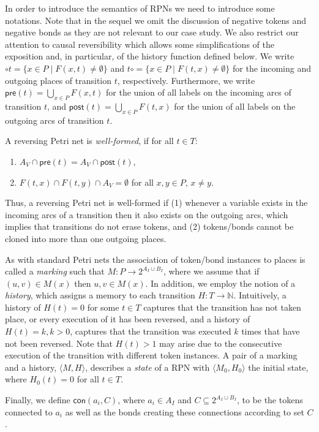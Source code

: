 \documentclass[runningheads]{llncs}
\newcommand{\PN}{reversing Petri net }
\newcommand{\guard}[1]{\mathsf{pre}(#1)}
\newcommand{\effects}[1]{\mathsf{post}(#1)}
\newcommand{\connected}{\mathsf{con}}
\newcommand{\state}[2]{\langle {#1}, {#2}\rangle}
\begin{document}
In order to introduce the semantics of RPNs we need to introduce some notations. Note that in 
the sequel we omit the discussion of negative tokens and negative bonds as they are not relevant to our
case study. We also restrict  our attention to causal reversibility which allows some simplifications
of the exposition and, in particular, of the history function defined below.
We write 
$\circ t =   \{x\in P\mid  F(x,t)\neq \emptyset\}$ and  
$ t\circ = \{x\in P\mid F(t,x)\neq \emptyset\}$
for the incoming and outgoing places of transition
$t$, respectively. Furthermore, we write
$\guard{t}  =   \bigcup_{x\in P} F(x,t)$ 
for the union of all labels on the
incoming arcs of  transition $t$, 
and $\effects{t}  =   \bigcup_{x\in P} F(t,x)$
for the union of all labels on the 
outgoing arcs of transition $t$. 
\begin{definition}\label{well-formed}{\rm 
		A \PN is \emph{well-formed}, if for all $t\in T$:
		\begin{enumerate}
			\item $A_V\cap \guard{t} = A_V\cap \effects{t}$,
			\item $ F(t,x)\cap F(t,y)\cap A_V=\emptyset$ for all $x,y\in P$, $x\neq y $. 
		\end{enumerate}
}\end{definition}
Thus, a \PN is well-formed if (1) whenever a variable exists in
the incoming arcs of a transition then it also exists on the outgoing arcs, which implies that transitions do not
erase tokens, and  (2) 
tokens/bonds cannot be cloned into more than one outgoing places.

As with standard Petri nets the association of token/bond instances to places is called a \emph{marking}  such that 
$M: P\rightarrow 2^{A_I\cup B_I}$, where we assume that if $(u,v)\in M(x)$ then $u, v\in M(x)$. 
In addition, we employ the notion of a \emph{history}, which assigns a memory to each
transition $H : T\rightarrow \mathbb{N}$. 
Intuitively, a history of $H(t) = 0$ for some $t \in T$ captures that the transition has not taken place, or 
every execution of it has been reversed, and a history
of $ H(t)=k, k>0$, captures that the transition was executed  $k$ times that have not been  reversed.
Note that $H(t)>1$ may
arise due to the consecutive execution of the transition with different token
instances. A pair of a marking and a history, $\state{M}{H}$, describes a \emph{state} of a RPN 
with $\state{M_0}{H_0}$ the initial state, where $H_0(t) = 0$ for all $t\in T$. 

Finally, we define $\connected(a_i,C)$, where $a_i\in A_I$ and $C\subseteq 2^{A_I\cup B_I}$,
to be the tokens connected
to $a_i$  as well as the bonds creating these connections according to 
set $C$. 
\end{document}
